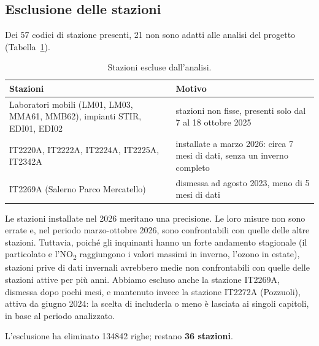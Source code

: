 \documentclass[11pt]{report}
\begin{document}
\subsection{Esclusione delle stazioni}
Dei 57 codici di stazione presenti, 21 non sono adatti alle analisi del
progetto (Tabella~\ref{tab:stazioni_escluse}).

\begin{table}[H]
  \centering
  \caption{Stazioni escluse dall'analisi.}
  \label{tab:stazioni_escluse}
  \begin{tabularx}{\textwidth}{>{\raggedright\arraybackslash}X >{\raggedright\arraybackslash}X}
    \toprule
    \textbf{Stazioni}                  & \textbf{Motivo}                                                          \\
    \midrule
    Laboratori mobili (LM01, LM03, MMA61, MMB62), impianti STIR, EDI01, EDI02
                                       & stazioni non fisse, presenti solo dal 7 al 18 ottobre 2025               \\
    IT2220A, IT2222A, IT2224A, IT2225A, IT2342A
                                       & installate a marzo 2026: circa 7 mesi di dati, senza un inverno completo \\
    IT2269A (Salerno Parco Mercatello) & dismessa ad agosto 2023, meno di 5 mesi di dati                          \\
    \bottomrule
  \end{tabularx}
\end{table}

Le stazioni installate nel 2026 meritano una precisione. Le loro misure non
sono errate e, nel periodo marzo-ottobre 2026, sono confrontabili con quelle
delle altre stazioni. Tuttavia, poiché gli inquinanti hanno un forte andamento
stagionale (il particolato e l'NO\textsubscript{2} raggiungono i valori massimi
in inverno, l'ozono in estate), stazioni prive di dati invernali avrebbero
medie non confrontabili con quelle delle stazioni attive per più anni. Abbiamo
escluso anche la stazione IT2269A, dismessa dopo pochi mesi, e mantenuto invece
la stazione IT2272A (Pozzuoli), attiva da giugno 2024: la scelta di includerla
o meno è lasciata ai singoli capitoli, in base al periodo analizzato.

L'esclusione ha eliminato \num{134842} righe; restano \textbf{36 stazioni}.
\end{document}
